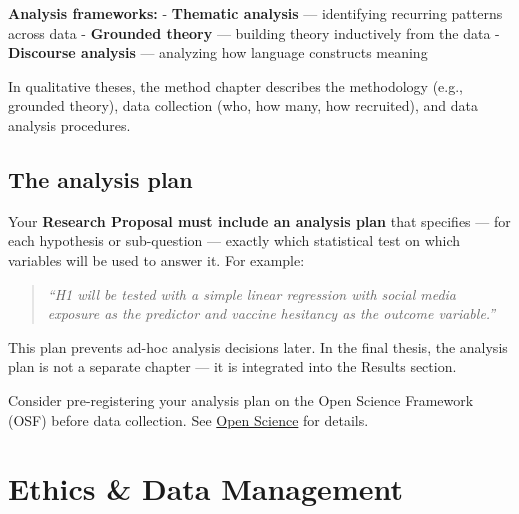 \documentclass[
  11pt,
  a4paper,
]{scrbook}
\begin{document}
\textbf{Analysis frameworks:} - \textbf{Thematic analysis} ---
identifying recurring patterns across data - \textbf{Grounded theory}
--- building theory inductively from the data - \textbf{Discourse
analysis} --- analyzing how language constructs meaning

In qualitative theses, the method chapter describes the methodology
(e.g., grounded theory), data collection (who, how many, how recruited),
and data analysis procedures.

\section{The analysis plan}\label{the-analysis-plan}

Your \textbf{Research Proposal must include an analysis plan} that
specifies --- for each hypothesis or sub-question --- exactly which
statistical test on which variables will be used to answer it. For
example:

\begin{quote}
\emph{``H1 will be tested with a simple linear regression with social
media exposure as the predictor and vaccine hesitancy as the outcome
variable.''}
\end{quote}

This plan prevents ad-hoc analysis decisions later. In the final thesis,
the analysis plan is not a separate chapter --- it is integrated into
the Results section.

\begin{tcolorbox}[enhanced jigsaw, bottomrule=.15mm, opacityback=0, toprule=.15mm, colframe=quarto-callout-tip-color-frame, left=2mm, rightrule=.15mm, title=\textcolor{quarto-callout-tip-color}{\faLightbulb}\hspace{0.5em}{Pre-registration}, colbacktitle=quarto-callout-tip-color!10!white, bottomtitle=1mm, colback=white, breakable, toptitle=1mm, titlerule=0mm, leftrule=.75mm, arc=.35mm, opacitybacktitle=0.6, coltitle=black]

Consider pre-registering your analysis plan on the Open Science
Framework (OSF) before data collection. See \href{open-science.qmd}{Open
Science} for details.

\end{tcolorbox}

\chapter{Ethics \& Data Management}\label{ethics-data-management}
\end{document}
